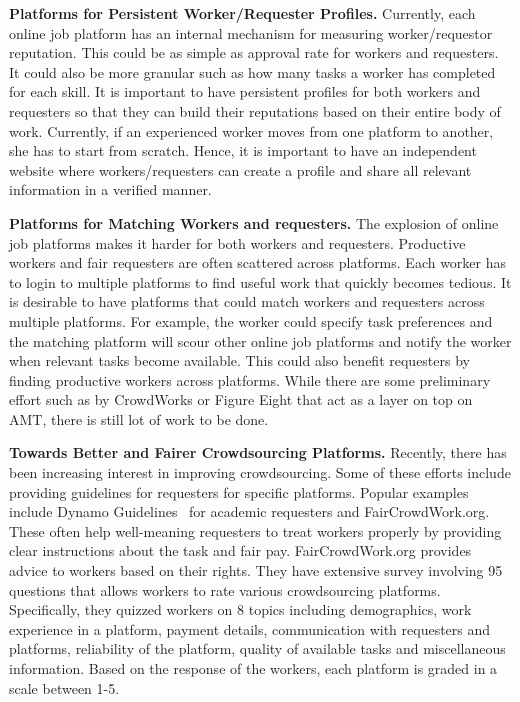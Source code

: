\textbf{Platforms for Persistent Worker/Requester Profiles.}
Currently, each online job platform has an internal mechanism for measuring worker/requestor reputation.
This could be as simple as approval rate for workers and requesters.
It could also be more granular such as how many tasks a worker has completed for each skill.
It is important to have persistent profiles for both workers and requesters so that
they can build their reputations based on their entire body of work.
Currently, if an experienced worker moves from one platform to another,
she has to start from scratch.
Hence, it is important to have an independent website where workers/requesters
can create a profile and share all relevant information in a verified manner.

\textbf{Platforms for Matching Workers and requesters.}
The explosion of online job platforms makes it harder for both workers and requesters.
Productive workers and fair requesters are often scattered across platforms.
Each worker has to login to multiple platforms to find useful work that quickly becomes tedious.
It is desirable to have platforms that could match workers and requesters across multiple platforms.
For example, the worker could specify task preferences and the matching platform will scour
other online job platforms and notify the worker when relevant tasks become available.
This could also benefit requesters by finding productive workers across platforms.
While there are some preliminary effort such as by CrowdWorks or Figure Eight
that act as a layer on top on AMT, there is still lot of work to be done.

\textbf{Towards Better and Fairer Crowdsourcing Platforms.}
Recently, there has been increasing interest in improving crowdsourcing.
Some of these efforts include providing guidelines for requesters for specific platforms.
Popular examples include Dynamo Guidelines~\cite{salehi2015we} for academic requesters and FairCrowdWork.org.
These often help well-meaning requesters to treat workers properly
by providing clear instructions about the task and fair pay.
FairCrowdWork.org provides advice to workers based on their rights.
They have extensive survey involving 95 questions that allows workers to rate various crowdsourcing platforms.
Specifically, they quizzed workers on 8 topics including demographics, work experience in a platform, payment details, communication with requesters and platforms, reliability of the platform, quality of available tasks and miscellaneous information.
Based on the response of the workers, each platform is graded in a scale between 1-5.




